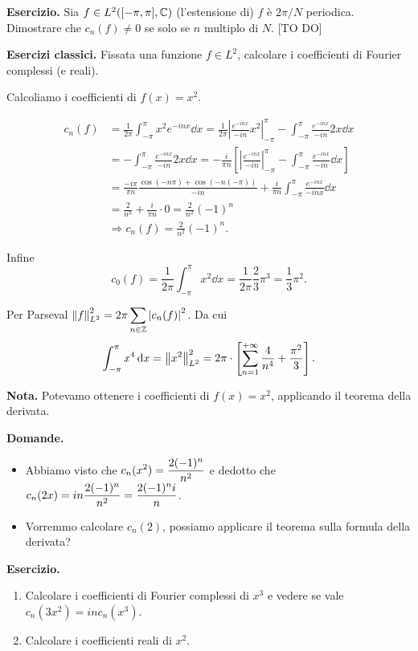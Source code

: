 \textbf{Esercizio.} Sia $f \in L^2([-\pi,\pi], \mathbb C) $ (l'estensione di) $f$ è $2\pi / N$ periodica. Dimostrare che $c_n(f) \neq 0$ se solo se $n$ multiplo di $N$. [TO DO]


\textbf{Esercizi classici.} Fissata una funzione $f \in L^2$, calcolare i coefficienti di Fourier complessi (e reali).

Calcoliamo i coefficienti di $f(x) = x^2$.

\begin{align*}
	c_n(f) & = \frac{1}{2\pi} \int_{-\pi}^\pi x^2 e^{-inx} \dd x = \frac{1}{2\pi} \left| \frac{e^{-inx}}{-in} x^2 \right|_{-\pi}^\pi - \int_{-\pi}^\pi \frac{e^{-inx}}{-in} 2x \dd x \\
	& = - \int_{-\pi}^\pi \frac{e^{-inx}}{-in} 2x \dd x = -\frac{i}{\pi n} \left[ \left| \frac{e^{-inx}}{-in} \right|_{-\pi}^\pi - \int_{-\pi}^\pi \frac{e^{-inx}}{-in} \dd x  \right] \\
	& = \frac{-i \pi}{\pi n} \frac{\cos(-n\pi) + \cos(-n (-\pi))}{-in} + \frac{i}{\pi n} \int_{-\pi}^\pi \frac{e^{-inx}}{-inx} \dd x \\
	& = \frac{2}{n^2} + \frac{i}{\pi n} \cdot 0 = \frac{2}{n^2} (-1)^n \\
	& \Longrightarrow c_n(f) = \frac{2}{n^2} (-1)^n.
\end{align*}

Infine
%
$$
c_0(f) = \frac{1}{2\pi} \int_{-\pi}^\pi x^2 \dd x = \frac{1}{2\pi} \frac{2}{3} \pi^3 = \frac{1}{3} \pi^2.
$$
%

Per Parseval $\displaystyle \left\lVert f \right\rVert_{L^2}^2 = 2\pi \sum_{n \in \mathbb Z} \left| c_n(f) \right|^2$.
Da cui
%
$$
\int_{-\pi}^\pi x^4 \,\mathrm{d} x = \left\lVert x^2 \right\rVert_{L^2}^2 = 2\pi \cdot \left[ \sum_{n=1}^{+\infty} \frac{4}{n^4} + \frac{\pi^2}{3}  \right].
$$
%

\textbf{Nota.} Potevamo ottenere i coefficienti di $f(x) = x^2$, applicando il teorema della derivata.

\textbf{Domande.}
\begin{itemize}

	\item Abbiamo visto che $\displaystyle c_n(x^2) = \frac{2 (-1)^n}{n^2}$ e dedotto che $\displaystyle c_n(2x) = in \frac{2(-1)^n}{n^2} = \frac{2(-1)^n i}{n}$.


	\item Vorremmo calcolare $c_n(2)$, possiamo applicare il teorema sulla formula della derivata?

\end{itemize}

\textbf{Esercizio.}
\begin{enumerate}

	\item Calcolare i coefficienti di Fourier complessi di $x^3$ e vedere se vale $c_n(3x^2) = i n c_n(x^3)$.


	\item Calcolare i coefficienti reali di $x^2$.

\end{enumerate}

